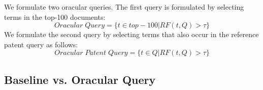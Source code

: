 
%

We formulate two oracular queries. The first query is formulated by selecting terms in the top-100 documents:
\begin{equation}
Oracular \; Query = \{t \in top-100|RF(t, Q)>\tau\}   
 \label{eq:score}
\end{equation}
We formulate the second query by selecting terms that also occur in the reference patent query as follows:
\begin{equation}
 Oracular \; Patent \; Query = \{t\in Q|RF(t, Q)>\tau\}   
 \label{eq:score}
\end{equation}

\subsection{Baseline vs. Oracular Query}

\label{sec:baseline_vs_oracular}


